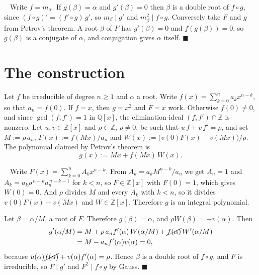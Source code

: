 \documentclass[10pt]{article}
\newcommand\Z{\mathbb{Z}}
\newcommand\Q{\mathbb{Q}}
\newcommand\1{\mathbb{1}}
\theoremstyle{plain}
\theoremstyle{remark}
\theoremstyle{plain}
\newenvironment{pf}{%
  \par\addvspace{\medskipamount}\noindent\uwave{pf.}\ \ignorespaces}{%
  \unskip\nobreak\hfill$\blacksquare$\par\addvspace{\medskipamount}}
\begin{document}
\begin{pf}
  Write $f = m_{\alpha}$. If $g(\beta) = \alpha$ and $g'(\beta) = 0$ then
  $\beta$ is a double root of $f \circ g$, since $(f \circ g)' = (f' \circ g)\,g'$,
  so $m_{\beta} \mid g'$ and $m_{\beta}^{2} \mid f \circ g$. Conversely take $F$
  and $g$ from Petrov's theorem. A root $\beta$ of $F$ has $g'(\beta) = 0$ and
  $f(g(\beta)) = 0$, so $g(\beta)$ is a conjugate of $\alpha$, and conjugation
  gives $\alpha$ itself.
\end{pf}

\section{The construction}\label{Scons}

Let $f$ be irreducible of degree $n \geq 1$ and $\alpha$ a root. Write
$f(x) = \sum_{k=0}^{n} a_{k}x^{n-k}$, so that $a_{n} = f(0)$. If $f = x$, then
$g = x^{2}$ and $F = x$ work. Otherwise $f(0) \neq 0$, and since
$\gcd(f,f') = 1$ in $\Q[x]$, the elimination ideal $(f,f') \cap \Z$ is nonzero.
Let $u, v \in \Z[x]$ and $\rho \in \Z$, $\rho \neq 0$, be such that
$u\,f + v\,f' = \rho$, and set $M := \rho\,a_{n}$, $F(x) := f(Mx)/a_{n}$ and
$W(x) := \bigl(v(0)F(x) - v(Mx)\bigr)/\rho$. The polynomial claimed by
Petrov's theorem is
\begin{equation}\label{Eg}
  g(x) := Mx + f(Mx)\,W(x).
\end{equation}

\begin{pf}
  Write $F(x) = \sum_{k=0}^{n} A_{k}x^{n-k}$. From $A_{k} = a_{k}M^{n-k}/a_{n}$
  we get $A_{n} = 1$ and
  $A_{k} = a_{k}\rho^{\,n-k}a_{n}^{\,n-k-1}$ for $k < n$, so $F \in \Z[x]$ with
  $F(0) = 1$, which gives $W(0) = 0$. And $\rho$ divides $M$ and every $A_{k}$
  with $k < n$, so it divides $v(0)F(x) - v(Mx)$ and $W \in \Z[x]$. Therefore
  $g$ is an integral polynomial.

  Let $\beta = \alpha/M$, a root of $F$. Therefore $g(\beta) = \alpha$, and
  $\rho W(\beta) = -v(\alpha)$. Then
  \begin{align*}
    g'(\alpha/M)
      &= M + \rho\,a_{n}f'(\alpha)\,W(\alpha/M)
         + \cancel{f(\alpha)}\,W'(\alpha/M) \\
      &= M - a_{n}f'(\alpha)v(\alpha) = 0 ,
  \end{align*}
  because $u(\alpha)\cancel{f(\alpha)} + v(\alpha)f'(\alpha) = \rho$.
  Hence $\beta$ is a double root of $f \circ g$, and $F$ is irreducible, so
  $F \mid g'$ and $F^{2} \mid f \circ g$ by Gauss.
\end{pf}
\end{document}

